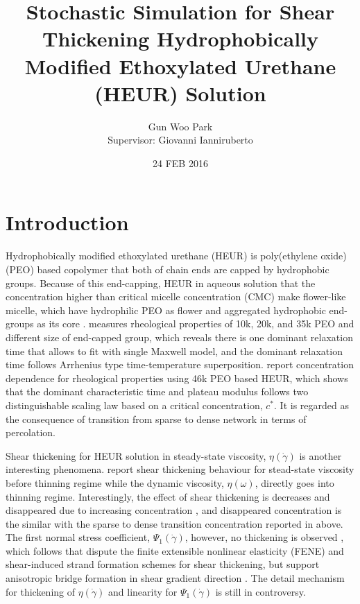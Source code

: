 \documentclass[10pt, a4paper]{article}
\title{Stochastic Simulation for Shear Thickening Hydrophobically Modified Ethoxylated Urethane (HEUR) Solution}
\author{Gun Woo Park\\ Supervisor: Giovanni Ianniruberto}
\affil{\textit{Dipartimento di Ingegneria Chimica, dei Materiali e della Produzione Industriale, Università degli Studi di Napoli Federico II}}
\date{24 FEB 2016}
\begin{document}
\maketitle
\section{Introduction}
Hydrophobically modified ethoxylated urethane (HEUR) is poly(ethylene oxide) (PEO) based copolymer that both of chain ends are capped by hydrophobic groups. Because of this end-capping, HEUR in aqueous solution that the concentration higher than critical micelle concentration (CMC) make flower-like micelle, which have hydrophilic PEO as flower and aggregated hydrophobic end-groups as its core \parencite{Xu:1996ke}. \textcite{Annable:1993jd} measures rheological properties of 10k, 20k, and 35k PEO and different size of end-capped group, which reveals there is one dominant relaxation time that allows to fit with single Maxwell model, and the dominant relaxation time follows Arrhenius type time-temperature superposition. \textcite{Uneyama:2012ge} report concentration dependence for rheological properties using 46k PEO based HEUR, which shows that the dominant characteristic time and plateau modulus follows two distinguishable scaling law based on a critical concentration, $c^\ast$. It is regarded as the consequence of transition from sparse to dense network in terms of percolation.


Shear thickening for HEUR solution in steady-state viscosity, $\eta(\dot{\gamma})$ is another interesting phenomena. \textcite{Annable:1993jd} report shear thickening behaviour for stead-state viscosity before thinning regime while the dynamic viscosity, $\eta(\omega)$, directly goes into thinning regime. Interestingly, the effect of shear thickening is decreases and disappeared due to increasing concentration \parencite{Suzuki:2013kk}, and disappeared concentration is the similar with the sparse to dense transition concentration reported in above. The first normal stress coefficient, $\Psi_1(\dot{\gamma})$, however, no thickening is observed \parencites{Pellens:2004ga, Suzuki:2013kk}, which follows that \textcite{Suzuki:2012gfa} dispute the finite extensible nonlinear elasticity (FENE) and shear-induced strand formation \parencite{Tam:1998fi} schemes for shear thickening, but support anisotropic bridge formation in shear gradient direction \parencite{Uneyama:2012ge}. The detail mechanism for thickening of $\eta(\dot{\gamma})$ and linearity for $\Psi_1(\dot{\gamma})$ is still in controversy.
\end{document}
